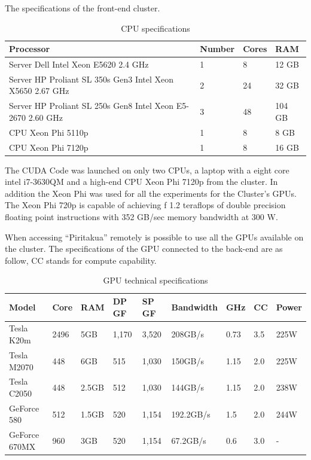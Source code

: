 The specifications of the front-end cluster.


\begin{table}[h]
\centering
\begin{tabular}{ | p{7.1cm}  | l | l | l |}
  \hline
  Processor & Number & Cores & RAM  \\
  \hline
  Server Dell Intel Xeon E5620 2.4 GHz & 1 & 8 & 12 GB \\
  \hline
  Server HP Proliant SL 350s Gen3 Intel Xeon X5650 2.67 GHz & 2 & 24 & 32 GB \\
  \hline
   Server HP Proliant SL 250s Gen8 Intel Xeon E5-2670 2.60 GHz & 3 & 48 &104 GB \\
   \hline
   CPU Xeon Phi  5110p & 1 & 8 & 8 GB\\
   \hline
   CPU Xeon Phi 7120p  & 1 & 8 & 16 GB\\
   \hline
  \end{tabular}
      \caption{CPU specifications}
  \label{tab:cpus}
  \end{table}
  

 The CUDA Code was launched on only two CPUs, a laptop with a eight core intel i7-3630QM and a high-end CPU Xeon Phi 7120p from the cluster. In addition the Xeon Phi was used for all the experiments for the Cluster's GPUs. The Xeon Phi 720p is capable of achieving f 1.2 teraflops of double precision floating point instructions with 352 GB/sec memory bandwidth at 300 W.

When accessing ``Piritakua'' remotely is possible to use all the GPUs available on the cluster.
 The specifications of the GPU connected to the back-end are as follow, CC stands for compute capability.

\begin{table}[h]
\centering
  \begin{tabular}{ |  l  |  l  |  l  |  l  |  l  | l | l | l |l | }
    \hline
    Model & Core& RAM& DP GF& SP GF& Bandwidth& GHz& CC & Power\\
    \hline
    Tesla K20m & 2496 & 5GB & 1,170 & 3,520 & 208GB/s & 0.73 & 3.5 & 225W \\
   \hline
    Tesla M2070 & 448 & 6GB & 515 & 1,030 & 150GB/s & 1.15 &  2.0 & 225W\\
   \hline
     Tesla C2050 & 448 & 2.5GB & 512 & 1,030 & 144GB/s & 1.15  & 2.0 & 238W \\
   \hline
      GeForce 580 & 512 & 1.5GB & 520 & 1,154 & 192.2GB/s & 1.5 & 2.0 & 244W \\
   \hline
   GeForce 670MX & 960 & 3GB & 520 & 1,154 & 67.2GB/s & 0.6 & 3.0 &  - \\
   \hline
  \end{tabular}
    \caption{GPU technical specifications}
  \label{tab:gpus}
  \end{table}
  
